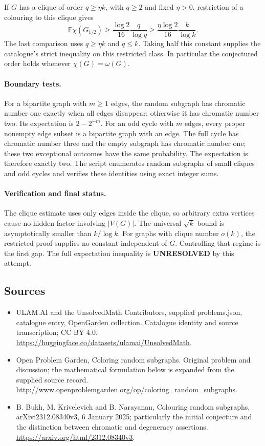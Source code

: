\documentclass[11pt,a4paper]{article}
\begin{document}
If $G$ has a clique of order $q\ge\eta k$, with $q\ge2$ and fixed $\eta>0$, restriction of a colouring to this clique gives
\[
 \mathbb E\chi(G_{1/2})\ge\frac{\log 2}{16}\frac{q}{\log q}
 \ge\frac{\eta\log 2}{16}\frac{k}{\log k}.
\]
The last comparison uses $q\ge\eta k$ and $q\le k$. Taking half this constant supplies the catalogue's strict inequality on this restricted class. In particular the conjectured order holds whenever $\chi(G)=\omega(G)$.

\paragraph{Boundary tests.}
For a bipartite graph with $m\ge1$ edges, the random subgraph has chromatic number one exactly when all edges disappear; otherwise it has chromatic number two. Its expectation is $2-2^{-m}$. For an odd cycle with $m$ edges, every proper nonempty edge subset is a bipartite graph with an edge. The full cycle has chromatic number three and the empty subgraph has chromatic number one; these two exceptional outcomes have the same probability. The expectation is therefore exactly two. The script enumerates random subgraphs of small cliques and odd cycles and verifies these identities using exact integer sums.

\paragraph{Verification and final status.}
The clique estimate uses only edges inside the clique, so arbitrary extra vertices cause no hidden factor involving $|V(G)|$. The universal $\sqrt{k}$ bound is asymptotically smaller than $k/\log k$. For graphs with clique number $o(k)$, the restricted proof supplies no constant independent of $G$. Controlling that regime is the first gap. The full expectation inequality is \textbf{UNRESOLVED} by this attempt.

\subsection{Sources}
\begin{itemize}
\item[S1] ULAM.AI and the UnsolvedMath Contributors, supplied problems.json, catalogue entry, OpenGarden collection. Catalogue identity and source transcription; CC BY 4.0.
\url{https://huggingface.co/datasets/ulamai/UnsolvedMath}.
\item[S2] Open Problem Garden, Coloring random subgraphs. Original problem and discussion; the mathematical formulation below is expanded from the supplied source record.
\url{http://www.openproblemgarden.org/op/coloring_random_subgraphs}.
\item[S3] B. Bukh, M. Krivelevich and B. Narayanan, Colouring random subgraphs, arXiv:2312.08340v3, 6 January 2025; particularly the initial conjecture and the distinction between chromatic and degeneracy assertions.
\url{https://arxiv.org/html/2312.08340v3}.
\end{itemize}
\end{document}
